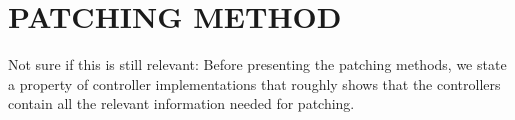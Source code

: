 
\section{PATCHING METHOD}
\label{sec:method}

{\color{red} Not sure if this is still relevant: }Before presenting the patching methods, we state a property of controller implementations that roughly shows that the controllers contain all the relevant information needed for patching. %

